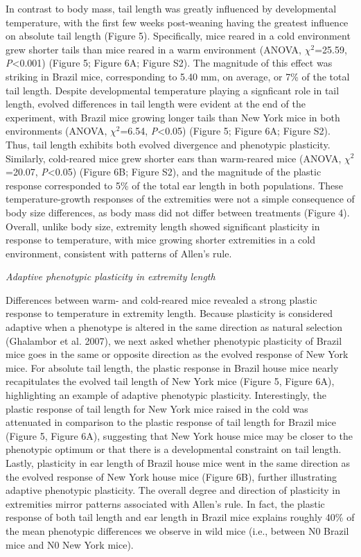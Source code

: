 \documentclass[]{article}
\begin{document}
In contrast to body mass, tail length was greatly influenced by
developmental temperature, with the first few weeks post-weaning having
the greatest influence on absolute tail length (Figure 5). Specifically,
mice reared in a cold environment grew shorter tails than mice reared in
a warm environment (ANOVA, \(\chi^2\)=25.59, \emph{P}\textless{}0.001)
(Figure 5; Figure 6A; Figure S2). The magnitude of this effect was
striking in Brazil mice, corresponding to 5.40 mm, on average, or 7\% of
the total tail length. Despite developmental temperature playing a
signficant role in tail length, evolved differences in tail length were
evident at the end of the experiment, with Brazil mice growing longer
tails than New York mice in both environments (ANOVA, \(\chi^2\)=6.54,
\emph{P}\textless{}0.05) (Figure 5; Figure 6A; Figure S2). Thus, tail
length exhibits both evolved divergence and phenotypic plasticity.
Similarly, cold-reared mice grew shorter ears than warm-reared mice
(ANOVA, \(\chi^2\)=20.07, \emph{P}\textless{}0.05) (Figure 6B; Figure
S2), and the magnitude of the plastic response corresponded to 5\% of
the total ear length in both populations. These temperature-growth
responses of the extremities were not a simple consequence of body size
differences, as body mass did not differ between treatments (Figure 4).
Overall, unlike body size, extremity length showed significant
plasticity in response to temperature, with mice growing shorter
extremities in a cold environment, consistent with patterns of Allen's
rule.

\vspace{3.5mm}

\noindent\emph{Adaptive phenotypic plasticity in extremity length}

Differences between warm- and cold-reared mice revealed a strong plastic
response to temperature in extremity length. Because plasticity is
considered adaptive when a phenotype is altered in the same direction as
natural selection (Ghalambor et al. 2007), we next asked whether
phenotypic plasticity of Brazil mice goes in the same or opposite
direction as the evolved response of New York mice. For absolute tail
length, the plastic response in Brazil house mice nearly recapitulates
the evolved tail length of New York mice (Figure 5, Figure 6A),
highlighting an example of adaptive phenotypic plasticity.
Interestingly, the plastic response of tail length for New York mice
raised in the cold was attenuated in comparison to the plastic response
of tail length for Brazil mice (Figure 5, Figure 6A), suggesting that
New York house mice may be closer to the phenotypic optimum or that
there is a developmental constraint on tail length. Lastly, plasticity
in ear length of Brazil house mice went in the same direction as the
evolved response of New York house mice (Figure 6B), further
illustrating adaptive phenotypic plasticity. The overall degree and
direction of plasticity in extremities mirror patterns associated with
Allen's rule. In fact, the plastic response of both tail length and ear
length in Brazil mice explains roughly 40\% of the mean phenotypic
differences we observe in wild mice (i.e., between N0 Brazil mice and N0
New York mice).
\end{document}
